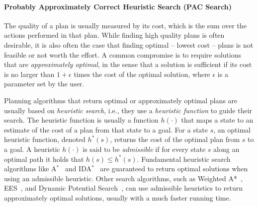\documentclass[12pt]{article}
\begin{document}
\paragraph{Probably Approximately Correct Heuristic Search (PAC Search)} 
The quality of a plan is usually measured by its cost, which is the sum over the actions performed in that plan. While finding high quality plans is often desirable, it is also often the case that finding optimal -- lowest cost -- plans is  not feasible or not worth the effort. A common compromise is to require solutions that are {\em approximately optimal}, in the sense that a solution is sufficient if its cost is no larger than $1+\epsilon$ times the cost of the optimal solution, where $\epsilon$ is a parameter set by the user. 

Planning algorithms that return optimal or approximately optimal plans are usually based on {\em heuristic search}, i.e., they use a {\em heuristic function} to guide their search. The heuristic function is usually a function $h(\cdot)$ that maps a state to an estimate of the cost of a plan from that state to a goal. For a state $s$, an optimal heuristic function, denoted $h^*(s)$, returns the cost of the optimal plan from $s$ to a goal. A heuristic $h(\cdot)$  is said to be {\em admissible} if for every state $s$ along an optimal path it holds that $h(s)\leq h^*(s)$. Fundamental heuristic search algorithms like A$^*$~\cite{hart1968formal} and IDA$^*$~\cite{korf1985depth} are guaranteed to return optimal solutions when using an admissible heuristic. Other search algorithms, such as Weighted A*~\cite{pohl1973avoidance}, EES~\cite{thayer2011bounded}, and Dynamic Potential Search~\cite{gilon2016dynamic}, can use admissible heuristics to return approximately optimal solutions, usually with a much faster running time. 
\end{document}
